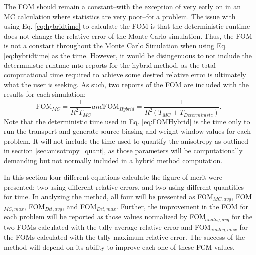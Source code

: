 The FOM should remain a constant--with the exception of very early on in an MC
calculation where statistics are very poor--for a problem. The issue with using
Eq. \ref{eq:hybridtime} to calculate the FOM is that the deterministic runtime
does not change the relative error of the Monte Carlo simulation. Thus, the FOM
is not a constant throughout the Monte Carlo Simulation when using Eq.
\ref{eq:hybridtime} as the time.
However, it would be disingenuous to not include the deterministic runtime into
reports for the hybrid method, as the total computational time required to
achieve some desired relative error is ultimately what the user is seeking. As
such, two reports of the FOM are included with the results for each simulation:
\begin{subequations}
  \begin{equation}
    \text{FOM}_{MC} = \frac{1}{R^{2}T_{MC}}
  \label{eq:FOMMC}
  \end{equation}
and
  \begin{equation}
    \text{FOM}_{Hybrid} = \frac{1}{R^{2}(T_{MC} + T_{Deterministc})} .
  \label{eq:FOMHybrid}
  \end{equation}
  \label{eq:FOMtime}
\end{subequations}
Note that the deterministic time used in Eq. \ref{eq:FOMHybrid} is the time only
to run the transport and generate source biasing and weight window values for
each problem. It will not include the time used to quantify the anisotropy as
outlined in section \ref{sec:anisotropy_quant}, as those parameters will be
computationally demanding but not normally included in a hybrid method
computation.

In this section four different equations calculate the figure of merit were presented: two
using different relative errors, and two using different quantities
for time. In analyzing the method, all four will be presented as FOM$_{MC,avg}$,
FOM$_{MC,max}$, FOM$_{Det,avg}$, and FOM$_{Det,max}$. Further, the improvement
in the FOM for each problem will be reported as those values normalized by
FOM$_{analog,avg}$ for the two FOMs calculated with the tally average relative
error and FOM$_{analog,max}$ for the FOMs calculated with the tally maximum
relative error. The success of the method will depend on its ability to improve
each one of these FOM values.

